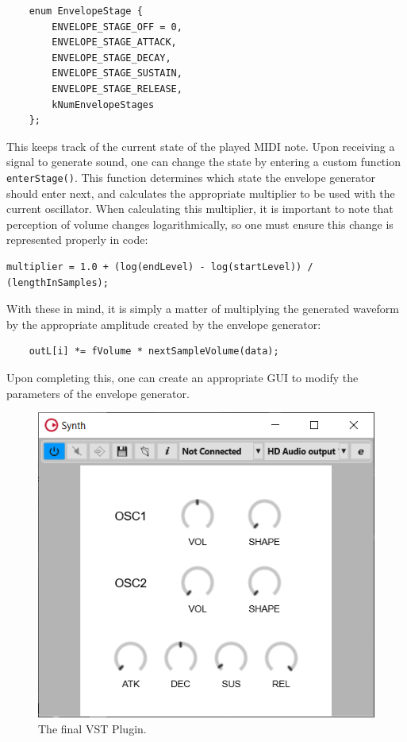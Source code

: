 \documentclass[12pt]{article}
\begin{document}
\begin{lstlisting}
	enum EnvelopeStage {
		ENVELOPE_STAGE_OFF = 0,
		ENVELOPE_STAGE_ATTACK,
		ENVELOPE_STAGE_DECAY,
		ENVELOPE_STAGE_SUSTAIN,
		ENVELOPE_STAGE_RELEASE,
		kNumEnvelopeStages
	};
\end{lstlisting} 

This keeps track of the current state of the played MIDI note. Upon receiving a signal to generate sound, one can change the state by entering a custom function \verb*|enterStage()|. This function determines which state the envelope generator should enter next, and calculates the appropriate multiplier to be used with the current oscillator. When calculating this multiplier, it is important to note that perception of volume changes logarithmically, so one must ensure this change is represented properly in code:

\begin{lstlisting}[breaklines = true]
	multiplier = 1.0 + (log(endLevel) - log(startLevel)) / (lengthInSamples);
\end{lstlisting}

With these in mind, it is simply a matter of multiplying the generated waveform by the appropriate amplitude created by the envelope generator:

\begin{lstlisting}
	outL[i] *= fVolume * nextSampleVolume(data);
\end{lstlisting}

Upon completing this, one can create an appropriate GUI to modify the parameters of the envelope generator.

\begin{figure}[h]
	\centering
	\includegraphics[scale=0.8]{program.PNG}
	\caption{The final VST Plugin.}
\end{figure}
\end{document}
